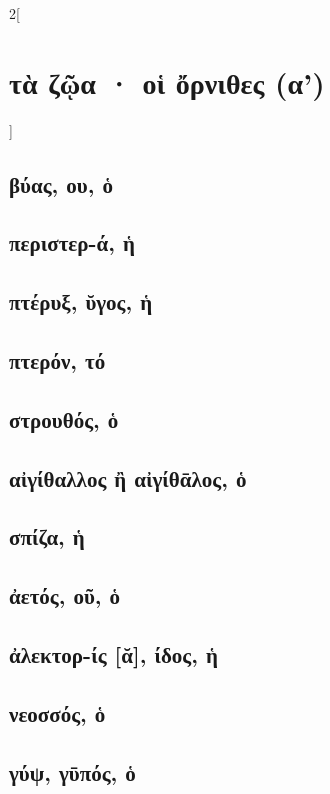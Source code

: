 \documentclass{book}
\begin{document}
\begin{multicols}{2}[\section{τὰ ζῷα · οἱ ὄρνιθες (α')}]
{\renewcommand \thesubsection {\thesection} }
\subsection{βύας, ου, ὁ}
\subsection{περιστερ-ά, ἡ}
\subsection{πτέρυξ, ῠγος, ἡ}
\subsection{πτερόν, τό}
\subsection{στρουθός, ὁ}
\subsection{αἰγίθαλλος ἢ αἰγίθᾱλος, ὁ}
\subsection{σπίζα, ἡ}
\subsection{ἀετός, οῦ, ὁ}
\subsection{ἀλεκτορ-ίς [ᾰ], ίδος, ἡ}
\subsection{νεοσσός, ὁ}
\subsection{γύψ, γῡπός, ὁ}

\end{multicols}
\end{document}
